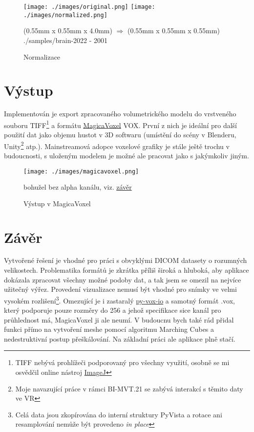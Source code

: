 \documentclass[czech]{pyt-report}
\begin{document}
\begin{figure}[h]
  \centering\leavevmode
  \texttt{[image: ./images/original.png]}
  \texttt{[image: ./images/normalized.png]}\vskip-0.5cm
  \smallskip
  \caption{Normalizace}
  \smallskip
  \tiny (0.55mm x 0.55mm x 4.0mm) $\Rightarrow$ (0.55mm x 0.55mm x 0.55mm)
  \tiny ./samples/brain-2022 - 2001
  \label{fig:normalization}
\end{figure}

\section{Výstup}
\label{sec:vystup}
Implementován je export zpracovaného volumetrického modelu do vrstveného souboru TIFF\footnote{TIFF nebývá prohlížeči podporovaný pro všechny využití, osobně se mi osvědčil online nástroj \href{https://ij.imjoy.io/}{ImageJ}} a formátu \href{https://ephtracy.github.io/}{MagicaVoxel} VOX\cite{bib:magicavoxel-vox}. První z nich je ideální pro další použití dat jako objemu hustot v 3D softwaru (umístění do scény v Blenderu, Unity\footnote{Moje navazující práce v rámci BI-MVT.21 se zabývá interakcí s těmito daty ve VR} atp.). Mainstreamová adopce voxelové grafiky je stále ještě trochu v budoucnosti, s uloženým modelem je možné ale pracovat jako s jakýmkoliv jiným.

\begin{figure}[h]
  \centering\leavevmode
  \texttt{[image: ./images/magicavoxel.png]}\vskip-0.5cm
  \medskip
  \caption{Výstup v MagicaVoxel}
  \smallskip
  \tiny bohužel bez alpha kanálu, viz. \hyperref[sec:zaver]{závěr}
  \label{fig:magicavoxel}
\end{figure}

\section{Závěr}
\label{sec:zaver}
Vytvořené řešení je vhodné pro práci s obvyklými DICOM datasety o rozumných velikostech. Problematika formátů je zkrátka příliš široká a hluboká, aby aplikace dokázala zpracovat všechny možné podoby dat, a tak jsem se omezil na nejvíce užitečný výřez. Provedení vizualizace nemusí být vhodné pro snímky ve velmi vysokém rozlišení\footnote{Celá data jsou zkopírována do interní struktury PyVista a rotace ani resamplování nemůže být provedeno \emph{in place}}. Omezující je i zastaralý \href{https://github.com/gromgull/py-vox-io}{py-vox-io} a samotný formát .vox\cite{bib:magicavoxel-vox}, který podporuje pouze rozměry do 256 a jehož specifikace sice kanál pro průhlednost má, MagicaVoxel ji ale neumí. V budoucnu bych také rád přidal funkci přímo na vytvoření meshe pomocí algoritmu Marching Cubes\cite{bib:marchingcubes} a nedestruktivní postup přeškálování. Na základní práci ale aplikace plně stačí.
\end{document}
